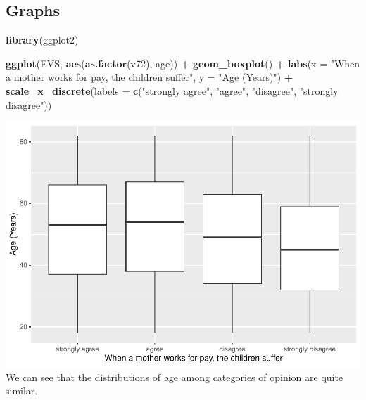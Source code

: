 \documentclass[
]{article}
\newenvironment{Shaded}{\begin{snugshade}}{\end{snugshade}}
\newcommand{\AttributeTok}[1]{\textcolor[rgb]{0.13,0.29,0.53}{#1}}
\newcommand{\FunctionTok}[1]{\textcolor[rgb]{0.13,0.29,0.53}{\textbf{#1}}}
\newcommand{\NormalTok}[1]{#1}
\newcommand{\SpecialCharTok}[1]{\textcolor[rgb]{0.81,0.36,0.00}{\textbf{#1}}}
\newcommand{\StringTok}[1]{\textcolor[rgb]{0.31,0.60,0.02}{#1}}
\begin{document}
\hypertarget{graphs}{%
\subsection{Graphs}\label{graphs}}

\begin{Shaded}
\begin{Highlighting}[]
\FunctionTok{library}\NormalTok{(ggplot2)}

\FunctionTok{ggplot}\NormalTok{(EVS, }\FunctionTok{aes}\NormalTok{(}\FunctionTok{as.factor}\NormalTok{(v72), age)) }\SpecialCharTok{+} 
  \FunctionTok{geom\_boxplot}\NormalTok{() }\SpecialCharTok{+} 
  \FunctionTok{labs}\NormalTok{(}\AttributeTok{x =} \StringTok{"When a mother works for pay, the children suffer"}\NormalTok{, }\AttributeTok{y =} \StringTok{"Age (Years)"}\NormalTok{) }\SpecialCharTok{+} 
  \FunctionTok{scale\_x\_discrete}\NormalTok{(}\AttributeTok{labels =} \FunctionTok{c}\NormalTok{(}\StringTok{"strongly agree"}\NormalTok{, }\StringTok{"agree"}\NormalTok{, }\StringTok{"disagree"}\NormalTok{, }\StringTok{"strongly disagree"}\NormalTok{))}
\end{Highlighting}
\end{Shaded}

\includegraphics{Report-for-statisticians_files/figure-latex/plot_v72-1.pdf}
We can see that the distributions of age among categories of opinion are
quite similar.\\
\end{document}
